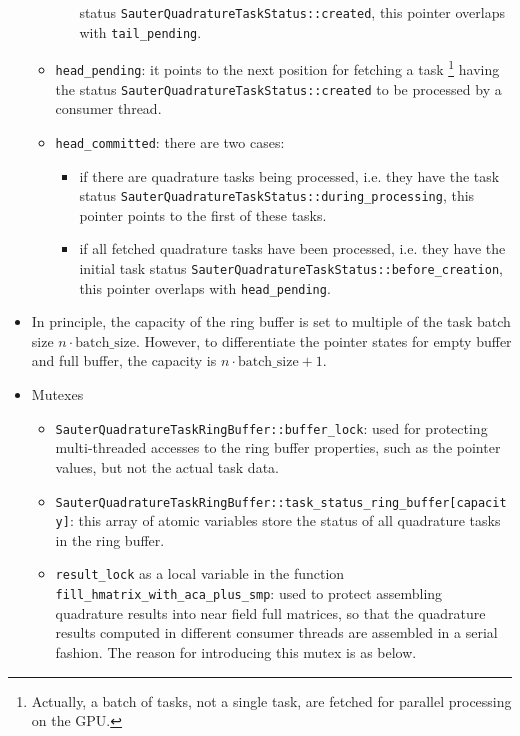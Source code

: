 \documentclass[11pt, a4paper]{article}
\begin{document}
\begin{itemize}
\begin{itemize}
\begin{itemize}
      status \texttt{SauterQuadratureTaskStatus::created}, this pointer overlaps with
      \texttt{tail\_pending}.
    \end{itemize}
  \item \texttt{head\_pending}: it points to the next position for fetching a task
    \footnote{Actually, a batch of tasks, not a single task, are fetched for parallel
      processing on the GPU.} having the status
    \texttt{SauterQuadratureTaskStatus::created} to be processed by a consumer thread.
  \item \texttt{head\_committed}: there are two cases:
    \begin{itemize}
    \item if there are quadrature tasks being processed, i.e. they have the task status
      \texttt{SauterQuadratureTaskStatus::during\_processing}, this pointer points to the
      first of these tasks.
    \item if all fetched quadrature tasks have been processed, i.e. they have the initial
      task status \texttt{SauterQuadratureTaskStatus::before\_creation}, this pointer
      overlaps with \texttt{head\_pending}.
    \end{itemize}
  \end{itemize}
\item In principle, the capacity of the ring buffer is set to multiple of the task batch
  size $n \cdot \text{batch\_size}$. However, to differentiate the pointer states for
  empty buffer and full buffer, the capacity is $n \cdot \text{batch\_size} + 1$.
\item Mutexes
  \begin{itemize}
  \item \texttt{SauterQuadratureTaskRingBuffer::buffer\_lock}: used for protecting
    multi-threaded accesses to the ring buffer properties, such as the pointer values, but
    not the actual task data.
  \item \texttt{SauterQuadratureTaskRingBuffer::task\_status\_ring\_buffer[capacity]}: this
    array of atomic variables store the status of all quadrature tasks in the ring buffer.
  \item \texttt{result\_lock} as a local variable in the function
    \texttt{fill\_hmatrix\_with\_aca\_plus\_smp}: used to protect assembling quadrature
    results into near field full matrices, so that the quadrature results computed in
    different consumer threads are assembled in a serial fashion. The reason for
    introducing this mutex is as below.


\end{itemize}
\end{itemize}
\end{document}
